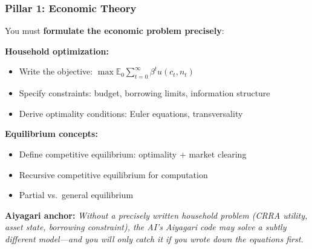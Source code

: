 \documentclass[10pt,english,aspectratio=169]{beamer}
\begin{document}
\begin{frame}
\frametitle{Pillar 1: Economic Theory}

You must \textbf{formulate the economic problem precisely}:

\vspace{0.2cm}

\textbf{Household optimization:}
\begin{itemize}
    \item Write the objective: $\max \mathbb{E}_0 \sum_{t=0}^\infty \beta^t u(c_t, n_t)$
    \item Specify constraints: budget, borrowing limits, information structure
    \item Derive optimality conditions: Euler equations, transversality
\end{itemize}

\textbf{Equilibrium concepts:}
\begin{itemize}
    \item Define competitive equilibrium: optimality + market clearing
    \item Recursive competitive equilibrium for computation
    \item Partial vs.\ general equilibrium
\end{itemize}

\vspace{0.3cm}

\textbf{Aiyagari anchor:} \textit{Without a precisely written household problem (CRRA utility, asset state, borrowing constraint), the AI's Aiyagari code may solve a subtly different model---and you will only catch it if you wrote down the equations first.}
\end{frame}
\end{document}
